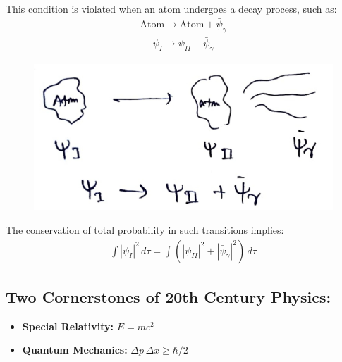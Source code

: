 \documentclass[14pt]{article} %
\begin{document}
This condition is violated when an atom undergoes a decay process, such as:
\begin{align*}
\text{Atom} \rightarrow \text{Atom} + \bar{\psi}_{\gamma}
\end{align*}
\begin{align*}
    \psi_I \rightarrow \psi_{II} + \bar{\psi}_\gamma
\end{align*}
\begin{figure}[H]
\centering
\includegraphics[width=0.6\linewidth]{L(-2)_3.jpg}
\caption*{}
\end{figure}
The conservation of total probability in such transitions implies:
\begin{align*}
\int |\psi_I|^2 \, d\tau = \int \left(|\psi_{II}|^2 + |\bar{\psi}_\gamma|^2\right) \, d\tau
\end{align*}
\subsection*{Two Cornerstones of 20th Century Physics:}
\begin{itemize}
    \item \textbf{Special Relativity:} $E = mc^2$
    \item \textbf{Quantum Mechanics:} $\Delta p \, \Delta x \geq \hbar/2$
\end{itemize}
\end{document}
